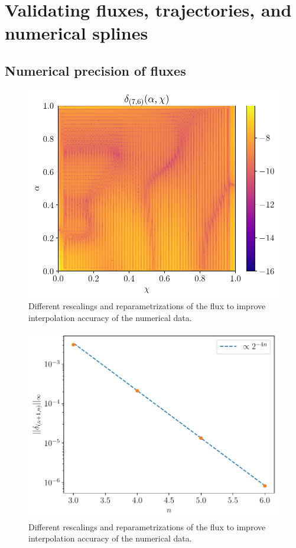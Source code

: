 \documentclass[%
 reprint,
 nofootinbib,
 amsmath,amssymb,
 aps,
 prd,
]{revtex4-2}
\begin{document}
\section{Validating fluxes, trajectories, and numerical splines}
\label{app:tests}

\subsection{Numerical precision of fluxes}
\label{app:fluxtests}

\begin{figure}[h!]
    \centering
    \includegraphics[width=0.95\linewidth]{figures/flux_spline_error.pdf}
    \caption{Different rescalings and reparametrizations of the flux to improve interpolation accuracy of the numerical data.}
    \label{fig:fluxSplineError}
\end{figure}

\begin{figure}[bhtp]
    \centering
    \includegraphics[width=0.95\linewidth]{figures/spline_convergence.pdf}
    \caption{Different rescalings and reparametrizations of the flux to improve interpolation accuracy of the numerical data.}
    \label{fig:fluxSplineConvergence}
\end{figure}
\end{document}
